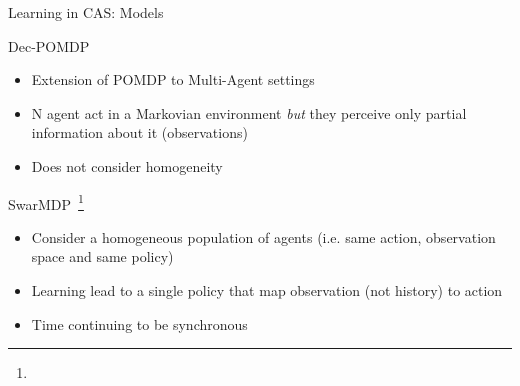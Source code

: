 \documentclass[presentation]{beamer}\mode<presentation>{\usetheme{AMSBolognaFC}}
\begin{document}
\begin{frame}{Learning in CAS: Models}
		
	\begin{exampleblock}{Dec-POMDP \href{http://rbr.cs.umass.edu/camato/decpomdp/overview.html}{\faLink}}
		\begin{itemize}
			\item Extension of POMDP to Multi-Agent settings
			\item N agent act in a Markovian environment \emph{but} they perceive only partial information about it (observations)
			\item[\faExclamationTriangle] Does not consider homogeneity
		\end{itemize}
	\end{exampleblock}
	\begin{exampleblock}{SwarMDP~\footnote[frame]{}}
		\begin{itemize}
			\item Consider a homogeneous population of agents (i.e. same action, observation space and same policy)
			\item Learning lead to a single policy that map observation (not history) to action
			\item[\faExclamationTriangle] Time continuing to be synchronous
		\end{itemize}
	\end{exampleblock}
\end{frame}
\end{document}
